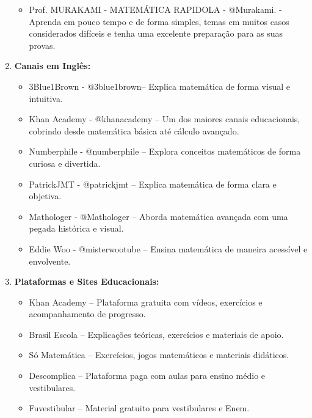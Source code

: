 \documentclass[a4paper,12pt]{article}
\begin{document}
\begin{enumerate}
\begin{itemize}
			\item Prof. MURAKAMI - MATEMÁTICA RAPIDOLA
			- @Murakami.
		 - Aprenda em pouco tempo e de forma simples, temas em muitos casos considerados difíceis e tenha uma excelente preparação para as suas provas.
		 
		\end{itemize}
	
			\item \textbf{Canais em Inglês:}
			
			\begin{itemize}
				\item 	3Blue1Brown - @3blue1brown– Explica matemática de forma visual e intuitiva.
				
				\item 	Khan Academy - @khanacademy – Um dos maiores canais educacionais, cobrindo desde matemática básica até cálculo avançado.
				
				\item 	Numberphile  - @numberphile – Explora conceitos matemáticos de forma curiosa e divertida.
				
				\item 	PatrickJMT - @patrickjmt – Explica matemática de forma clara e objetiva.
				
				\item 	Mathologer  - @Mathologer – Aborda matemática avançada com uma pegada histórica e visual.
				
				\item 	Eddie Woo - @misterwootube – Ensina matemática de maneira acessível e envolvente.
							
				
				
			\end{itemize}
			
			\item \textbf{Plataformas e Sites Educacionais:}
			\begin{itemize}
				\item 	Khan Academy – Plataforma gratuita com vídeos, exercícios e acompanhamento de progresso.
				
			\item	Brasil Escola – Explicações teóricas, exercícios e materiais de apoio.
				
		\item		Só Matemática – Exercícios, jogos matemáticos e materiais didáticos.
				
			\item 	Descomplica – Plataforma paga com aulas para ensino médio e vestibulares.
				
		\item		Fuvestibular – Material gratuito para vestibulares e Enem.
			\end{itemize}
		
			
			
			
	\end{enumerate}
	
\end{document}
